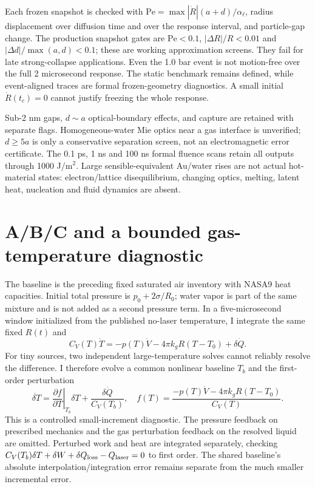 \documentclass[10pt,a4paper]{article}
\begin{document}
Each frozen snapshot is checked with $\mathrm{Pe}=\max|\dot R|(a+d)/\alpha_\ell$, radius displacement over diffusion time and over the response interval, and particle-gap change. The production snapshot gates are $\mathrm{Pe}<0.1$, $|\Delta R|/R<0.01$ and $|\Delta d|/\max(a,d)<0.1$; these are working approximation screens. They fail for late strong-collapse applications. Even the 1.0 bar event is not motion-free over the full 2 microsecond response. The static benchmark remains defined, while event-aligned traces are formal frozen-geometry diagnostics. A small initial $\dot R(t_c)=0$ cannot justify freezing the whole response.

Sub-2 nm gaps, $d\sim a$ optical-boundary effects, and capture are retained with separate flags. Homogeneous-water Mie optics near a gas interface is unverified; $d\ge5a$ is only a conservative separation screen, not an electromagnetic error certificate. The 0.1 ps, 1 ns and 100 ns formal fluence scans retain all outputs through 1000 J/m$^2$. Large sensible-equivalent Au/water rises are not actual hot-material states: electron/lattice disequilibrium, changing optics, melting, latent heat, nucleation and fluid dynamics are absent.
\newpage

\section{A/B/C and a bounded gas-temperature diagnostic}
The baseline is the preceding fixed saturated air inventory with NASA9 heat capacities. Initial total pressure is $p_0+2\sigma/R_0$; water vapor is part of the same mixture and is not added as a second pressure term. In a five-microsecond window initialized from the published no-laser temperature, I integrate the same fixed $R(t)$ and
\begin{equation}
 C_V(T)\dot T=-p(T)\dot V-4\pi k_gR(T-T_0)+\delta\dot Q.
\end{equation}
For tiny sources, two independent large-temperature solves cannot reliably resolve the difference. I therefore evolve a common nonlinear baseline $T_b$ and the first-order perturbation
\begin{equation}
 \dot{\delta T}=\left.\frac{\partial f}{\partial T}\right|_{T_b}\delta T+
 \frac{\delta\dot Q}{C_V(T_b)},\quad
 f(T)=\frac{-p(T)\dot V-4\pi k_gR(T-T_0)}{C_V(T)}.\label{eq:variation}
\end{equation}
This is a controlled small-increment diagnostic. The pressure feedback on prescribed mechanics and the gas perturbation feedback on the resolved liquid are omitted. Perturbed work and heat are integrated separately, checking $C_V(T_b)\delta T+\delta W+\delta Q_{\rm loss}-Q_{\rm laser}=0$ to first order. The shared baseline's absolute interpolation/integration error remains separate from the much smaller incremental error.
\end{document}
